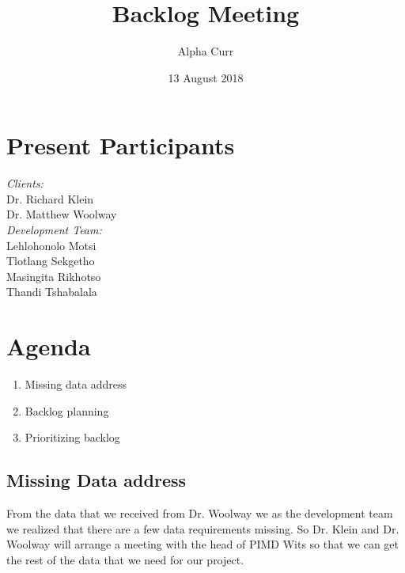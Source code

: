 \documentclass[11pt]{article}
\title{Backlog Meeting}
\author{Alpha Curr}
\date{13 August 2018}
\begin{document}
\maketitle

\section{Present Participants}
\textit{Clients:}\\
Dr. Richard Klein\\
Dr. Matthew Woolway\\
\newline
\textit{Development Team:}\\
Lehlohonolo Motsi\\
Tlotlang Sekgetho\\
Masingita Rikhotso\\
Thandi Tshabalala

\section{Agenda}
\begin{enumerate}
\item Missing data address
\item Backlog planning
\item Prioritizing backlog
\end{enumerate}

\subsection{Missing Data address}
From the data that we received from Dr. Woolway we as the development team we realized that there are a few data requirements missing. So Dr. Klein and Dr. Woolway will arrange a meeting with the head of PIMD Wits so that we can get the rest of the data that we need for our project.\\
\end{document}
